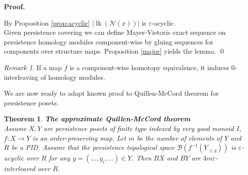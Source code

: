 \documentclass[english,12pt]{article}
\newcounter{stmcounter}[section]
\newcounter{thcounter}
\numberwithin{equation}{section}
\newtheorem{theorem}[thcounter]{Theorem}
\theoremstyle{definition}
\theoremstyle{remark}
\newtheorem{remark}[stmcounter]{Remark}
\newenvironment{pf}{\noindent\textbf{Proof.}}{\qed}
\begin{document}
\begin{pf} ~ \par
  By Proposition \ref{prop:acyclic} $\left|\operatorname{lk}(\mathcal{N}(x))\right|$ is $\varepsilon$-acyclic.\\

  Given persistence covering we can define Mayer-Vietoris exact sequence on persistence homology modules component-wise by gluing sequences for components over structure maps. Proposition \ref{major} yields the lemma.
\end{pf}

\begin{remark}
  If a map $f$ is a component-wise homotopy equivalence, it induces $0$-interleaving of homology modules.
\end{remark}

We are now ready to adapt known proof to Quillen-McCord theorem for persistence posets.

\begin{theorem} \textbf{The approximate Quillen-McCord theorem}\\
  Assume $X, Y$ are persistence posets of finite type indexed by very good monoid $I$, $f : X \to Y$ is an order-preserving map. Let $m$ be the number of elements of $Y$ and $R$ be a PID. Assume that the persistence topological space $\mathcal{B}(f^{-1}(Y_{\leqslant y}))$ is $\varepsilon$-acyclic over $R$ for any $y=(\ldots,y_i,\ldots) \in Y$. Then $BX$ and $BY$ are $4m\varepsilon$-interleaved over $R$.\\
\end{theorem}
\end{document}
